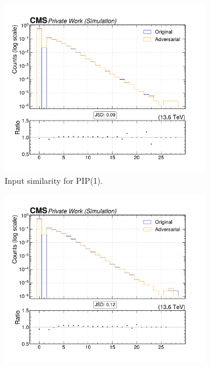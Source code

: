 \begin{figure}[htbp]
  \centering
  \begin{subfigure}[t]{0.32\textwidth}
    \includegraphics[width=\linewidth]{media/output/features/compare/intprob_1/cmp_global_features_TagVarCSV_jetNTracksEtaRel.pdf}
    \caption{Input similarity for PIP(1).}
  \end{subfigure}\hfill
  \begin{subfigure}[t]{0.32\textwidth}
    \includegraphics[width=\linewidth]{media/output/features/compare/intprob_2/cmp_global_features_TagVarCSV_jetNTracksEtaRel.pdf}

\end{subfigure}
\end{figure}

